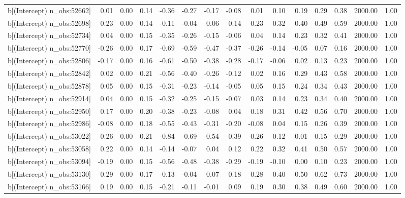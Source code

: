 \begin{table}[ht]
\begin{tabular}{rrrrrrrrrrrrrrr}
  b[(Intercept) n\_obs:52662] & 0.01 & 0.00 & 0.14 & -0.36 & -0.27 & -0.17 & -0.08 & 0.01 & 0.10 & 0.19 & 0.29 & 0.38 & 2000.00 & 1.00 \\ 
  b[(Intercept) n\_obs:52698] & 0.23 & 0.00 & 0.14 & -0.11 & -0.04 & 0.06 & 0.14 & 0.23 & 0.32 & 0.40 & 0.49 & 0.59 & 2000.00 & 1.00 \\ 
  b[(Intercept) n\_obs:52734] & 0.04 & 0.00 & 0.15 & -0.35 & -0.26 & -0.15 & -0.06 & 0.04 & 0.14 & 0.23 & 0.32 & 0.41 & 2000.00 & 1.00 \\ 
  b[(Intercept) n\_obs:52770] & -0.26 & 0.00 & 0.17 & -0.69 & -0.59 & -0.47 & -0.37 & -0.26 & -0.14 & -0.05 & 0.07 & 0.16 & 2000.00 & 1.00 \\ 
  b[(Intercept) n\_obs:52806] & -0.17 & 0.00 & 0.16 & -0.61 & -0.50 & -0.38 & -0.28 & -0.17 & -0.06 & 0.02 & 0.13 & 0.23 & 2000.00 & 1.00 \\ 
  b[(Intercept) n\_obs:52842] & 0.02 & 0.00 & 0.21 & -0.56 & -0.40 & -0.26 & -0.12 & 0.02 & 0.16 & 0.29 & 0.43 & 0.58 & 2000.00 & 1.00 \\ 
  b[(Intercept) n\_obs:52878] & 0.05 & 0.00 & 0.15 & -0.31 & -0.23 & -0.14 & -0.05 & 0.05 & 0.15 & 0.24 & 0.34 & 0.43 & 2000.00 & 1.00 \\ 
  b[(Intercept) n\_obs:52914] & 0.04 & 0.00 & 0.15 & -0.32 & -0.25 & -0.15 & -0.07 & 0.03 & 0.14 & 0.23 & 0.34 & 0.40 & 2000.00 & 1.00 \\ 
  b[(Intercept) n\_obs:52950] & 0.17 & 0.00 & 0.20 & -0.38 & -0.23 & -0.08 & 0.04 & 0.18 & 0.31 & 0.42 & 0.56 & 0.70 & 2000.00 & 1.00 \\ 
  b[(Intercept) n\_obs:52986] & -0.08 & 0.00 & 0.18 & -0.55 & -0.43 & -0.31 & -0.20 & -0.08 & 0.04 & 0.15 & 0.26 & 0.39 & 2000.00 & 1.00 \\ 
  b[(Intercept) n\_obs:53022] & -0.26 & 0.00 & 0.21 & -0.84 & -0.69 & -0.54 & -0.39 & -0.26 & -0.12 & 0.01 & 0.15 & 0.29 & 2000.00 & 1.00 \\ 
  b[(Intercept) n\_obs:53058] & 0.22 & 0.00 & 0.14 & -0.14 & -0.07 & 0.04 & 0.12 & 0.22 & 0.32 & 0.41 & 0.50 & 0.57 & 2000.00 & 1.00 \\ 
  b[(Intercept) n\_obs:53094] & -0.19 & 0.00 & 0.15 & -0.56 & -0.48 & -0.38 & -0.29 & -0.19 & -0.10 & 0.00 & 0.10 & 0.23 & 2000.00 & 1.00 \\ 
  b[(Intercept) n\_obs:53130] & 0.29 & 0.00 & 0.17 & -0.13 & -0.04 & 0.07 & 0.18 & 0.28 & 0.40 & 0.50 & 0.62 & 0.73 & 2000.00 & 1.00 \\ 
  b[(Intercept) n\_obs:53166] & 0.19 & 0.00 & 0.15 & -0.21 & -0.11 & -0.01 & 0.09 & 0.19 & 0.30 & 0.38 & 0.49 & 0.60 & 2000.00 & 1.00 \\ 

\end{tabular}
\end{table}
